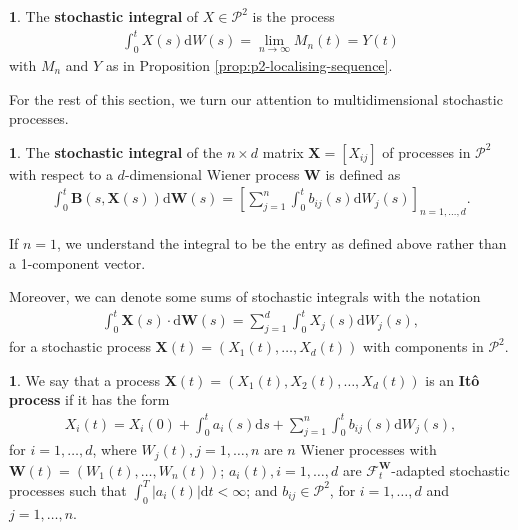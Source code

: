 \documentclass[english]{article}
\numberwithin{equation}{section}
\numberwithin{figure}{section}
\theoremstyle{bolddescit}
\theoremstyle{definition}
\newtheorem{definition}[theorem]{\protect\definitionname}
\theoremstyle{definition}
\theoremstyle{plain}
\theoremstyle{plain}
\theoremstyle{bolddesc}
\theoremstyle{plain}
\theoremstyle{remark}
\providecommand{\definitionname}{Definition}
\begin{document}
\begin{definition}
  The \textbf{stochastic integral} of $X \in \mathcal{P}^2$ is the process
  \begin{align*}
    \int_0^t X(s) \mathrm{d}W(s) = \lim_{n \to \infty} M_n(t) = Y(t)
  \end{align*}
  with $M_n$ and $Y$ as in Proposition \ref{prop:p2-localising-sequence}.
\end{definition}

For the rest of this section, we turn our attention to multidimensional stochastic processes.

\begin{definition}
  The \textbf{stochastic integral} of the $n \times d$ matrix $\mathbf{X} = [X_{ij}]$ of processes in $\mathcal{P}^2$ with respect to a $d$-dimensional Wiener process $\mathbf{W}$ is defined as
  \begin{align*}
    \int_0^t \mathbf{B}(s,\mathbf{X}(s)) \mathrm{d}\mathbf{W}(s) = \left[
      \sum_{j=1}^{n} \int_0^t b_{ij}(s) \mathrm{d}W_j(s)
    \right]_{n=1,\ldots,d}.
  \end{align*}
\end{definition}

If $n=1$, we understand the integral to be the entry as defined above rather than a 1-component vector.

Moreover, we can denote some sums of stochastic integrals with the notation
\begin{align*}
  \int_0^t \mathbf{X}(s) \cdot \mathrm{d}\mathbf{W}(s) = \sum_{j=1}^{d} \int_0^t X_j(s) \mathrm{d}W_j(s),
\end{align*}
for a stochastic process $\mathbf{X}(t) = (X_1(t), \ldots, X_d(t))$ with components in $\mathcal{P}^2$.

\begin{definition}
  We say that a process $\mathbf{X}(t) = (X_1(t), X_2(t), \ldots, X_d(t))$ is an \textbf{It\^o process} if it has the form
  \begin{align}\label{eq:ito-process}
    X_i(t) = X_i(0) + \int_0^t a_i(s) \mathrm{d}s + \sum_{j=1}^n \int_0^t b_{ij}(s) \mathrm{d}W_j(s),
  \end{align}
  for $i=1,\ldots,d$, where $W_j(t), j=1,\ldots,n$ are $n$ Wiener processes with $\mathbf{W}(t) = (W_1(t),\ldots,W_n(t))$; $a_i(t), i=1,\ldots,d$ are $\mathcal{F}^\mathbf{W}_t$-adapted stochastic processes such that $\int_0^T |a_i(t)| \mathrm{d}t < \infty$; and $b_{ij} \in \mathcal{P}^2$, for $i=1,\ldots,d$ and $j=1,\ldots,n$.
\end{definition}
\end{document}
